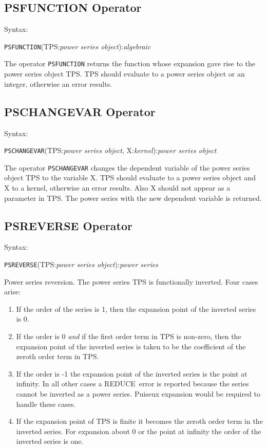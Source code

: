 \documentclass[11pt,letterpaper]{book}
\newcommand{\REDUCE}{REDUCE}
\begin{document}
\subsection{PSFUNCTION Operator}

Syntax:

\hspace*{2em} {\tt PSFUNCTION}(TPS:{\em power series object}):{\em algebraic}

The operator {\tt PSFUNCTION} returns the function whose expansion
gave rise to the power series object TPS. TPS should
evaluate to a power series object or an integer, otherwise an error
results.

\subsection{PSCHANGEVAR Operator}

Syntax:

\hspace*{2em} {\tt PSCHANGEVAR}(TPS:{\em power series object}, X:{\em kernel}):{\em power series object}

The operator {\tt PSCHANGEVAR} changes the dependent variable of the
power series object TPS to the variable X. TPS
should evaluate to a power series object and X to a kernel,
otherwise an error results.  Also X should not appear as a
parameter in TPS. The power series with the new dependent
variable is returned.

\subsection{PSREVERSE Operator}

Syntax:

\hspace*{2em} {\tt PSREVERSE}(TPS:{\em power series object}):{\em power series}

Power series reversion.  The power series TPS is functionally
inverted.  Four cases arise:

\begin{enumerate}
\item If the order of the series is 1, then the expansion point of the
inverted series is 0.

\item If the order is 0 {\em and} if the first order term in TPS
is non-zero, then the expansion point of the inverted series is taken
to be the coefficient of the zeroth order term in TPS.

\item If the order is -1 the expansion point of the inverted series
is the point at infinity.  In all other cases a \REDUCE\ error is
reported because the series cannot be inverted as a power series. Puiseux
 expansion would be required to handle these cases.

\item If the expansion point of TPS is finite it becomes the
zeroth order term in the inverted series. For expansion about 0 or the
point at infinity the order of the inverted series is one.
\end{enumerate}
\end{document}
